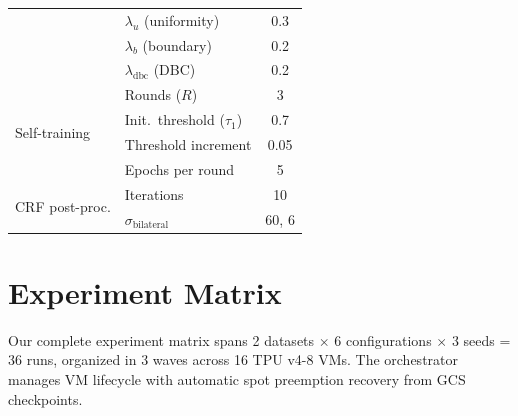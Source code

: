 \documentclass[10pt,twocolumn,letterpaper]{article}
\begin{document}
\begin{table}[H]
\begin{tabular}{llc}
& $\lambda_u$ (uniformity) & 0.3 \\
& $\lambda_b$ (boundary) & 0.2 \\
& $\lambda_{\text{dbc}}$ (DBC) & 0.2 \\
\midrule
\multirow{4}{*}{Self-training}
& Rounds ($R$) & 3 \\
& Init.\ threshold ($\tau_1$) & 0.7 \\
& Threshold increment & 0.05 \\
& Epochs per round & 5 \\
\midrule
\multirow{2}{*}{CRF post-proc.}
& Iterations & 10 \\
& $\sigma_{\text{bilateral}}$ & 60, 6 \\
\bottomrule
\end{tabular}
\end{table}


\section{Experiment Matrix}
\label{sec:supp_experiments}

Our complete experiment matrix spans 2 datasets $\times$ 6 configurations $\times$ 3 seeds = 36 runs, organized in 3 waves across 16 TPU v4-8 VMs. The orchestrator manages VM lifecycle with automatic spot preemption recovery from GCS checkpoints.
\end{document}
